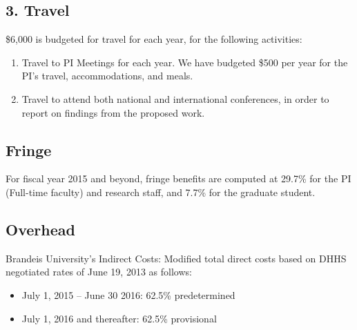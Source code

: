\documentclass[11pt]{article}
\begin{document}
 
\vspace{-1.0em}
\subsection*{3.  Travel}

\$6,000 is budgeted for travel for each year, for the following activities:
\vspace{-1.0em}
\begin{enumerate}
 
\item Travel to PI Meetings for each year. We have budgeted \$500 per year for the PI's travel,  accommodations, and meals. 
 
\item Travel to attend both national and international conferences, in order to report on findings from the proposed work. 

\end{enumerate}


\subsection*{Fringe}

For fiscal year 2015 and beyond, fringe benefits are computed at 29.7\% for the PI (Full-time faculty) and research staff, and 7.7\% for the graduate student.



\subsection*{Overhead}

Brandeis University's Indirect Costs: Modified total direct costs based on DHHS negotiated rates of June 19, 2013 as follows:
\begin{itemize}
\item July 1, 2015 -- June 30 2016: 62.5\% predetermined
\item July 1, 2016 and thereafter:  62.5\% provisional
\end{itemize}




 
\end{document}
